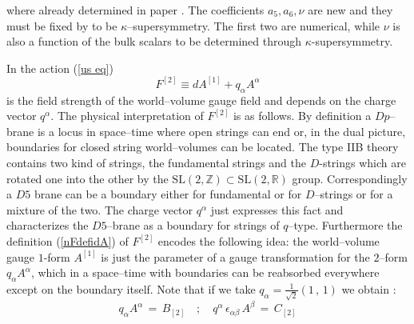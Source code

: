 \documentclass[a4paper,11pt]{article}
\begin{document}
where already determined in paper \cite{noidued3}. The coefficients $a_5,a_6,\nu$ are new
and they must be fixed by to be $\kappa$--supersymmetry. The first two
are numerical, while $\nu$ is  also a function  of the bulk scalars to be determined through
$\kappa$-supersymmetry.
\par
In the action (\ref{us eq})
\begin{equation}
  F^{[2]} \equiv dA^{[1]} + q_{\alpha} A^{\alpha}
\label{nFdefidA}
\end{equation}
is the field strength of the world--volume gauge field and depends on
the charge vector $q^{\alpha}$. The physical interpretation of
$F^{[2]}$ is as follows. By definition a $Dp$--brane is a locus in
space--time where open strings can end or, in the dual picture,
boundaries for closed string world--volumes can be located. The type IIB theory contains
two kind of strings, the fundamental strings and the $D$-strings
which are rotated one into the other by the $\mathrm{SL(2,\mathbb{Z})}\subset
\mathrm{SL(2,\mathbb{R})} $ group. Correspondingly a $D5$ brane can be
a boundary either for fundamental or for $D$--strings or for a
mixture of the two. The charge vector $q^\alpha$ just expresses this
fact and characterizes the $D5$--brane as a boundary for
strings of $q$--type. Furthermore the definition (\ref{nFdefidA}) of $F^{[2]}$
encodes the following idea: the world--volume gauge $1$-form $A^{[1]}$
is just the parameter of a gauge transformation for the $2$--form $q_{\alpha}
A^{\alpha}$, which in a space--time with boundaries can be reabsorbed
everywhere except on the boundary itself. Note that if we
take $q_{\alpha}  = \frac{1}{\sqrt{2}}(1 \, , \, 1)$ we obtain :
\begin{equation}
q_{\alpha} A^{\alpha} \, = \, B_{[2]} \quad ; \quad
   q^{\alpha} \, \epsilon_{\alpha \beta} \, A^{\beta} \, = \, C_{[2]}
\label{no q}
\end{equation}
\end{document}
